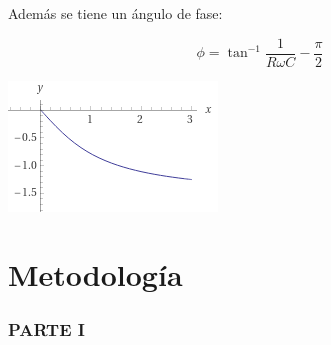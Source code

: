 \documentclass[DIV=calc, paper=a4, fontsize=11pt]{scrartcl}
\newenvironment{Figura}
  {\par\medskip\noindent\minipage{\linewidth}}
  {\endminipage\par\medskip}
\begin{document}
\begin{multicols}{2}
Además se tiene un ángulo de fase:

\begin{equation}
    \phi = \tan^{-1} {\frac{1}{R \omega C}} - \frac{\pi}{2}
\end{equation}

\begin{Figura}
    \centering
    \includegraphics[width=1 \textwidth]{grafica phi vs frec.PNG}
    \label{fig}
\end{Figura}













\section*{Metodología}

\subsubsection*{PARTE I}



\end{multicols}
\end{document}
